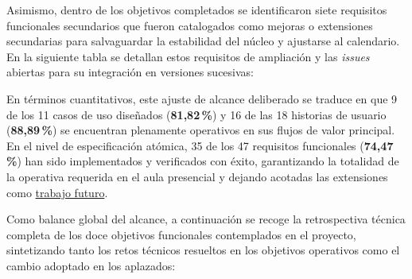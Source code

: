 Asimismo, dentro de los objetivos completados se identificaron siete requisitos funcionales secundarios que fueron catalogados como mejoras o extensiones secundarias para salvaguardar la estabilidad del núcleo y ajustarse al calendario. En la siguiente tabla se detallan estos requisitos de ampliación y las \textit{issues} abiertas para su integración en versiones sucesivas:

\begin{table}[H]
  \centering
  \small
  \renewcommand{\arraystretch}{1.4}
  \caption{Requisitos funcionales pospuestos como puntos de extensión.}
  \label{tab:rf_mejoras_issues}
\end{table}

En términos cuantitativos, este ajuste de alcance deliberado se traduce en que 9 de los 11 casos de uso diseñados (\textbf{81{,}82\,\%}) y 16 de las 18 historias de usuario (\textbf{88{,}89\,\%}) se encuentran plenamente operativos en sus flujos de valor principal. En el nivel de especificación atómica, 35 de los 47 requisitos funcionales (\textbf{74{,}47\,\%}) han sido implementados y verificados con éxito, garantizando la totalidad de la operativa requerida en el aula presencial y dejando acotadas las extensiones como \hyperref[sec:trabajo_futuro]{trabajo futuro}.

Como balance global del alcance, a continuación se recoge la retrospectiva técnica completa de los doce objetivos funcionales contemplados en el proyecto, sintetizando tanto los retos técnicos resueltos en los objetivos operativos como el cambio adoptado en los aplazados:

